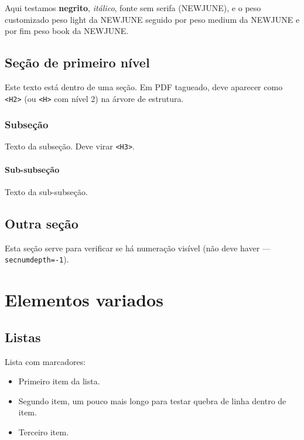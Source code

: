 \documentclass[11pt,a5paper,twoside,openright]{book}
\begin{document}
Aqui testamos \textbf{negrito}, \emph{itálico},
\textsf{fonte sem serifa (NEWJUNE)}, e o peso customizado
{\Light peso light da NEWJUNE} seguido por
{\media peso medium da NEWJUNE} e por fim
{\fontebook peso book da NEWJUNE}.

\section{Seção de primeiro nível}

Este texto está dentro de uma seção. Em PDF tagueado, deve
aparecer como \texttt{<H2>} (ou \texttt{<H>} com nível 2) na
árvore de estrutura.

\subsection{Subseção}

Texto da subseção. Deve virar \texttt{<H3>}.

\subsubsection{Sub-subseção}

Texto da sub-subseção.

\section{Outra seção}

Esta seção serve para verificar se há numeração visível (não
deve haver — \texttt{secnumdepth=-1}).

\chapter{Elementos variados}

\section{Listas}

Lista com marcadores:
\begin{itemize}
    \item Primeiro item da lista.
    \item Segundo item, um pouco mais longo para testar quebra
          de linha dentro de item.
    \item Terceiro item.
\end{itemize}
\end{document}

